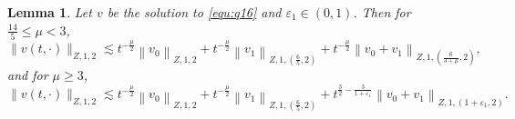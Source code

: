 \documentclass[11pt,twoside]{article}
\newcommand{\f}{\frac}
\theoremstyle{plain}
\newtheorem{lemma}[theorem]{Lemma}
\theoremstyle{definition}
\theoremstyle{remark}
\numberwithin{equation}{section}
\begin{document}
\begin{lemma}\label{lem2-1}
Let $v$ be the solution to \eqref{equ:q16} and $\varepsilon_1\in(0, 1)$. Then
for $\f{14}{5}\leq\mu<3$,
\begin{equation}\label{e:q46'}
\|v(t, \cdot)\|_{Z, 1, 2} \lesssim t^{-\f{\mu}{2}}\left\|v_0\right\|_{Z, 1, 2}
+t^{-\f{\mu}{2}}\left\|v_1\right\|_{Z, 1,(\f{6}{5}, 2)}
+t^{-\f{\mu}{2}}\left\|v_0+v_1\right\|_{Z, 1,(\f{6}{3+\mu}, 2)},
\end{equation}
and for $\mu\geq3$,
\begin{equation}\label{e:q46}
\|v(t, \cdot)\|_{Z, 1, 2} \lesssim t^{-\f{\mu}{2}}\left\|v_0\right\|_{Z, 1, 2}
+t^{-\f{\mu}{2}}\left\|v_1\right\|_{Z, 1,(\f{6}{5}, 2)}
+t^{\f{3}{2}-\f{3}{1+\varepsilon_1}}\left\|v_0+v_1\right\|_{Z, 1,(1+\varepsilon_1, 2)}.
\end{equation}
\end{lemma}
\end{document}
